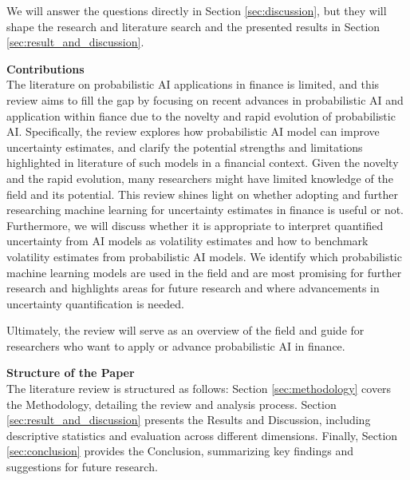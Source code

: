 We will answer the questions directly in Section \ref{sec:discussion}, but they will shape the research and literature search and the presented results in Section \ref{sec:result_and_discussion}. 

 
\textbf{Contributions}\\
The literature on probabilistic AI applications in finance is limited, and this review aims to fill the gap by focusing on recent advances in probabilistic AI and application within fiance due to the novelty and rapid evolution of probabilistic AI. Specifically, the review explores how probabilistic AI model can improve uncertainty estimates, and clarify the potential strengths and limitations highlighted in literature of such models in a financial context. Given the novelty and the rapid evolution, many researchers might have limited knowledge of the field and its potential. This review shines light on whether adopting and further researching machine learning for uncertainty estimates in finance is useful or not. Furthermore, we will discuss whether it is appropriate to interpret quantified uncertainty from AI models as volatility estimates and how to benchmark volatility estimates from probabilistic AI models. We identify which probabilistic machine learning models are used in the field and are most promising for further research and highlights areas for future research and where advancements in uncertainty quantification is needed. 

Ultimately, the review will serve as an overview of the field and guide for researchers who want to apply or advance probabilistic AI in finance. 


\textbf{Structure of the Paper}\\
The literature review is structured as follows: Section \ref{sec:methodology} covers the Methodology, detailing the review and analysis process. Section \ref{sec:result_and_discussion} presents the Results and Discussion, including descriptive statistics and evaluation across different dimensions. Finally, Section \ref{sec:conclusion} provides the Conclusion, summarizing key findings and suggestions for future research. 